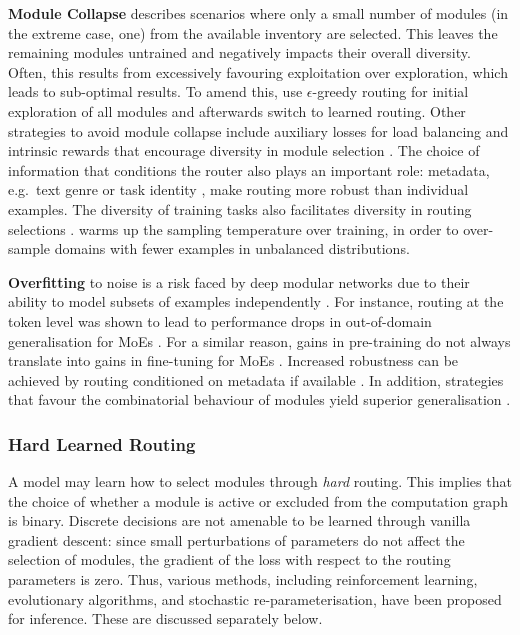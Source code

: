 \documentclass[10pt]{article} %
\begin{document}
\textbf{Module Collapse} describes scenarios where only a small number of modules (in the extreme case, one) from the available inventory are selected. This leaves the remaining modules untrained and negatively impacts their overall diversity. Often, this results from excessively favouring exploitation over exploration, which leads to sub-optimal results. To amend this, \citet{ahn2019deep} use $\epsilon$-greedy routing for initial exploration of all modules and afterwards switch to learned routing. Other strategies to avoid module collapse include auxiliary losses for load balancing \citep{shazeer2017outrageously, fedus2021switch} and intrinsic rewards that encourage diversity in module selection \citep{Cases2019Recursive}. The choice of information that conditions the router also plays an important role: metadata, e.g.\ text genre \citep{Cases2019Recursive} or task identity \citep{kudugunta2021beyond}, make routing more robust than individual examples. The diversity of training tasks also facilitates diversity in routing selections \citep{chang2018automatically,caccia2022multihead}. \citet{dua-etal-2022-tricks} warms up the sampling temperature over training, in order to over-sample domains with fewer examples in unbalanced distributions. 

\textbf{Overfitting} to noise is a risk faced by deep modular networks due to their ability to model subsets of examples independently \citep{rosenbaum2019routing}. For instance, routing at the token level was shown to lead to performance drops in out-of-domain generalisation for MoEs \citep{artetxe2021efficient}. For a similar reason, gains in pre-training do not always translate into gains in fine-tuning for MoEs \citep{fedus2021switch}. Increased robustness can be achieved by routing conditioned on metadata if available \citep{chang2018automatically, Cases2019Recursive,kudugunta2021beyond}. 
In addition, strategies that favour the combinatorial behaviour of modules yield superior generalisation \citep{chang2018automatically,ponti2022combining}.

\subsubsection{Hard Learned Routing}
\label{sssec:hardrouting}
A model may learn how to select modules through \textit{hard} routing. This implies that the choice of whether a module is active or excluded from the computation graph is binary. Discrete decisions are not amenable to be learned through vanilla gradient descent: since small perturbations of parameters do not affect the selection of modules, the gradient of the loss with respect to the routing parameters is zero. Thus, various methods, including reinforcement learning, evolutionary algorithms, and stochastic re-parameterisation, have been proposed for inference. These are discussed separately below.
\end{document}
